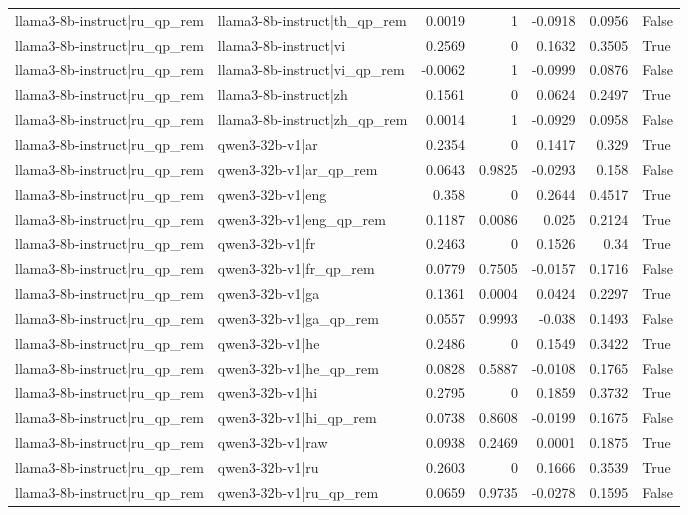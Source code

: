 \begin{table}
\begin{tabular}{l l r r r r l}
llama3-8b-instruct|ru_qp_rem & llama3-8b-instruct|th_qp_rem & 0.0019 & 1 & -0.0918 & 0.0956 & False \\
llama3-8b-instruct|ru_qp_rem & llama3-8b-instruct|vi & 0.2569 & 0 & 0.1632 & 0.3505 & True \\
llama3-8b-instruct|ru_qp_rem & llama3-8b-instruct|vi_qp_rem & -0.0062 & 1 & -0.0999 & 0.0876 & False \\
llama3-8b-instruct|ru_qp_rem & llama3-8b-instruct|zh & 0.1561 & 0 & 0.0624 & 0.2497 & True \\
llama3-8b-instruct|ru_qp_rem & llama3-8b-instruct|zh_qp_rem & 0.0014 & 1 & -0.0929 & 0.0958 & False \\
llama3-8b-instruct|ru_qp_rem & qwen3-32b-v1|ar & 0.2354 & 0 & 0.1417 & 0.329 & True \\
llama3-8b-instruct|ru_qp_rem & qwen3-32b-v1|ar_qp_rem & 0.0643 & 0.9825 & -0.0293 & 0.158 & False \\
llama3-8b-instruct|ru_qp_rem & qwen3-32b-v1|eng & 0.358 & 0 & 0.2644 & 0.4517 & True \\
llama3-8b-instruct|ru_qp_rem & qwen3-32b-v1|eng_qp_rem & 0.1187 & 0.0086 & 0.025 & 0.2124 & True \\
llama3-8b-instruct|ru_qp_rem & qwen3-32b-v1|fr & 0.2463 & 0 & 0.1526 & 0.34 & True \\
llama3-8b-instruct|ru_qp_rem & qwen3-32b-v1|fr_qp_rem & 0.0779 & 0.7505 & -0.0157 & 0.1716 & False \\
llama3-8b-instruct|ru_qp_rem & qwen3-32b-v1|ga & 0.1361 & 0.0004 & 0.0424 & 0.2297 & True \\
llama3-8b-instruct|ru_qp_rem & qwen3-32b-v1|ga_qp_rem & 0.0557 & 0.9993 & -0.038 & 0.1493 & False \\
llama3-8b-instruct|ru_qp_rem & qwen3-32b-v1|he & 0.2486 & 0 & 0.1549 & 0.3422 & True \\
llama3-8b-instruct|ru_qp_rem & qwen3-32b-v1|he_qp_rem & 0.0828 & 0.5887 & -0.0108 & 0.1765 & False \\
llama3-8b-instruct|ru_qp_rem & qwen3-32b-v1|hi & 0.2795 & 0 & 0.1859 & 0.3732 & True \\
llama3-8b-instruct|ru_qp_rem & qwen3-32b-v1|hi_qp_rem & 0.0738 & 0.8608 & -0.0199 & 0.1675 & False \\
llama3-8b-instruct|ru_qp_rem & qwen3-32b-v1|raw & 0.0938 & 0.2469 & 0.0001 & 0.1875 & True \\
llama3-8b-instruct|ru_qp_rem & qwen3-32b-v1|ru & 0.2603 & 0 & 0.1666 & 0.3539 & True \\
llama3-8b-instruct|ru_qp_rem & qwen3-32b-v1|ru_qp_rem & 0.0659 & 0.9735 & -0.0278 & 0.1595 & False \\

\end{tabular}
\end{table}
